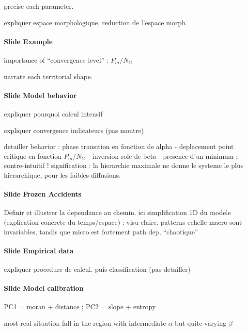 \documentclass[11pt]{article}
\begin{document}
precise each parameter.

expliquer espace morphologique, reduction de l'espace morph.

\paragraph{Slide Example}

importance of ``convergence level'' : $P_m / N_G$

narrate each territorial shape.


\paragraph{Slide Model behavior}

expliquer pourquoi calcul intensif

expliquer convergence indicateurs (pas montre)

detailler behavior : phase transition en fonction de alpha - deplacement point critique en fonction $P_m/N_G$ - inversion role de beta - presence d'un minimum : contre-intuitif ! signification : la hierarchie maximale ne donne le systeme le plus hierarchique, pour les faibles diffusions.




\paragraph{Slide Frozen Accidents}

Definir et illustrer la dependance au chemin. ici simplification 1D du modele (explication concrete du temps/espace) : visu claire. patterns echelle macro sont invariables, tandis que micro est fortement path dep, ``chaotique''



\paragraph{Slide Empirical data}

expliquer procedure de calcul. puis classification (pas detailler)


\paragraph{Slide Model calibration}

PC1 = moran + distance ; PC2 = slope + entropy

most real situation fall in the region with intermediate $\alpha$ but quite varying $\beta$
\end{document}
